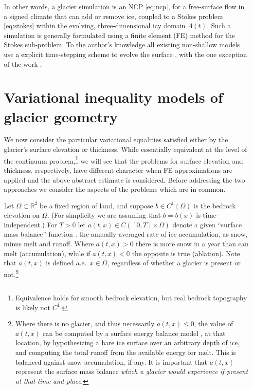 \documentclass[hidelinks,onefignum,onetabnum,final]{siamart220329}  %
\newcommand{\RR}{\mathbb{R}}
\begin{document}
In other words, a glacier simulation is an NCP \eqref{eq:ncp}, for a free-surface flow in a signed climate that can add or remove ice, coupled to a Stokes problem \eqref{eq:stokes} within the evolving, three-dimensional icy domain $\Lambda(t)$.  Such a simulation is generally formulated using a finite element (FE) method for the Stokes sub-problem.  To the author's knowledge all existing non-shallow models use a explicit time-stepping scheme to evolve the surface \cite[for example]{Jouvetetal2008}, with the one exception of the work \cite{WirbelJarosch2020}.  


\section{Variational inequality models of glacier geometry} \label{sec:models}

We now consider the particular variational equalities satisfied either by the glacier's surface elevation or thickness.  While essentially equivalent at the level of the continuum problem,\footnote{Equivalence holds for smooth bedrock elevation, but real bedrock topography is likely not $C^1$.} we will see that the problems for surface elevation and thickness, respectively, have different character when FE approximations are applied and the above abstract estimate is considered.  Before addressing the two approaches we consider the aspects of the problems which are in common.

Let $\Omega \subset \RR^2$ be a fixed region of land, and suppose $b \in C^1(\Omega)$ is the bedrock elevation on $\Omega$.  (For simplicity we are assuming that $b=b(x)$ is time-independent.)  For $T>0$ let $a(t,x) \in C([0,T] \times \Omega)$ denote a given ``surface mass balance'' function \cite{GreveBlatter2009}, the annually-averaged rate of ice accumulation, as snow, minus melt and runoff.  Where $a(t,x)>0$ there is more snow in a year than can melt (accumulation), while if $a(t,x)<0$ the opposite is true (ablation).  Note that $a(t,x)$ is defined a.e.~$x\in \Omega$, regardless of whether a glacier is present or not.\footnote{Where there is no glacier, and thus necessarily $a(t,x) \le 0$, the value of $a(t,x)$ can be computed by a surface energy balance model \cite{GreveBlatter2009}, at that location, by hypothesizing a bare ice surface over an arbitrary depth of ice, and computing the total runoff from the available energy for melt.  This is balanced against snow accumulation, if any.  It is important that $a(t,x)$ represent the surface mass balance \emph{which a glacier would experience if present at that time and place}.}
\end{document}
